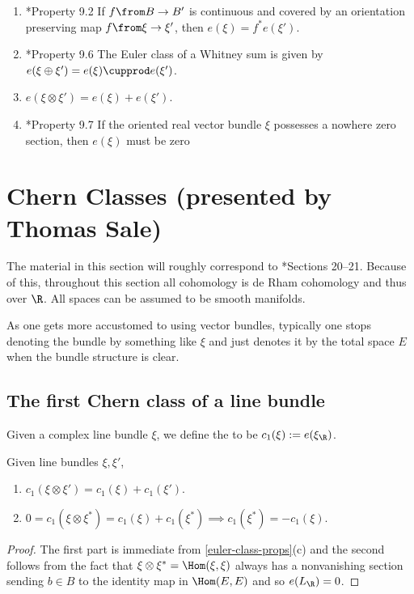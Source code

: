\documentclass[11pt,leqno,oneside]{amsbook}
\numberwithin{thm}{section}
\begin{document}
\begin{prop}\label{euler-class-props}
  \begin{enumerate}
  \item \cite{milnor-stasheff}*{Property 9.2} If \(f \from B \to B'\)
    is continuous and covered by an orientation preserving map \(f
    \from \xi \to \xi'\), then \(e(\xi) = f^*e(\xi')\).
  \item \cite{milnor-stasheff}*{Property 9.6} The Euler class of a
    Whitney sum is given by \(e(\xi \oplus \xi') = e(\xi) \cupprod
    e(\xi')\).
  \item \(e(\xi \otimes \xi') = e(\xi) + e(\xi')\).
  \item \cite{milnor-stasheff}*{Property 9.7} If the oriented real
    vector bundle \(\xi\) possesses a nowhere 
    zero section, then \(e(\xi)\) must be zero
  \end{enumerate}
\end{prop}
\section{Chern Classes  (presented by
  Thomas Sale)}
The material in this section will roughly correspond to
\cite{bott-tu}*{Sections 20--21}. Because of this, throughout this
section all cohomology is de Rham cohomology and thus over \(\R\). All
spaces can be assumed to be smooth manifolds.
\begin{rmk}
  As one gets more accustomed to using vector bundles, typically one
  stops denoting the bundle by something like \(\xi\) and just denotes
  it by the total space \(E\) when the bundle structure is clear.
\end{rmk}
\subsection{The first Chern class of a line bundle}
\begin{defn}
  Given a complex line bundle \(\xi\), we define the  to be \(c_1(\xi) :=
  e(\xi_\R)\).
\end{defn}
\begin{prop}\label{first-chern-class-of-line-bundle-props}
  Given line bundles \(\xi, \xi'\),
  \begin{enumerate}
  \item \(c_1(\xi \otimes \xi') = c_1(\xi) + c_1(\xi')\).
  \item \(0 = c_1(\xi \otimes \xi^*) = c_1(\xi) + c_1(\xi^*) \implies
    c_1(\xi^*) = -c_1(\xi)\).
  \end{enumerate}
\end{prop}
\begin{proof}
  The first part is immediate from \ref{euler-class-props}(c) and the
  second follows from the fact that \(\xi \otimes \xi^* =
  \Hom(\xi,\xi)\) always has a nonvanishing section sending \(b \in
  B\) to the identity map in \(\Hom(E,E)\) and so \(e(L_\R) = 0\).
\end{proof}
\end{document}
